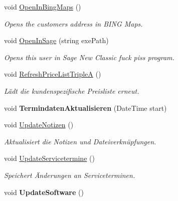 \begin{DoxyCompactItemize}
void \hyperlink{class_products_1_1_model_1_1_entities_1_1_kunde_ad015dec2413ee8edea8ccec27562530a}{Open\+In\+Bing\+Maps} ()
\begin{DoxyCompactList}\small\item\em Opens the customers address in B\+I\+NG Maps. \end{DoxyCompactList}\item 
void \hyperlink{class_products_1_1_model_1_1_entities_1_1_kunde_a12a47493408c0dfb649a785e1ff8fc93}{Open\+In\+Sage} (string exe\+Path)
\begin{DoxyCompactList}\small\item\em Opens this user in Sage New Classic fuck piss program. \end{DoxyCompactList}\item 
void \hyperlink{class_products_1_1_model_1_1_entities_1_1_kunde_a4b42c2e0572ec16181b115c6038a2c82}{Refresh\+Price\+List\+TripleA} ()
\begin{DoxyCompactList}\small\item\em Lädt die kundenspezifische Preisliste erneut. \end{DoxyCompactList}\item 
void {\bfseries Termindaten\+Aktualisieren} (Date\+Time start)\hypertarget{class_products_1_1_model_1_1_entities_1_1_kunde_a3a8ca8cb49366d6d45bcc26b3e7ffaf7}{}\label{class_products_1_1_model_1_1_entities_1_1_kunde_a3a8ca8cb49366d6d45bcc26b3e7ffaf7}

\item 
void \hyperlink{class_products_1_1_model_1_1_entities_1_1_kunde_a5eaad4f35a42d33ee836240b01e2fae6}{Update\+Notizen} ()
\begin{DoxyCompactList}\small\item\em Aktualisiert die Notizen und Dateiverknüpfungen. \end{DoxyCompactList}\item 
void \hyperlink{class_products_1_1_model_1_1_entities_1_1_kunde_a36bbc70994e0bd7c54b1cb029ed58e3c}{Update\+Servicetermine} ()
\begin{DoxyCompactList}\small\item\em Speichert Änderungen an Serviceterminen. \end{DoxyCompactList}\item 
void {\bfseries Update\+Software} ()\hypertarget{class_products_1_1_model_1_1_entities_1_1_kunde_a29783a94794df542518272b88420c3eb}{}\label{class_products_1_1_model_1_1_entities_1_1_kunde_a29783a94794df542518272b88420c3eb}


\end{DoxyCompactItemize}
